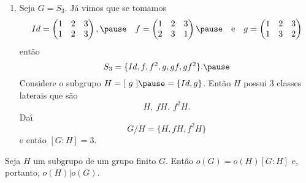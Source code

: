 \documentclass{beamer}
\begin{document}
    \begin{frame}
        \begin{exemplos}
            \begin{enumerate}[label=({\arabic*})]
                \conti

                \item Seja $G = S_3$. \pause J\'a vimos que se tomamos
                \[
                    Id = \begin{pmatrix}
                        1 & 2 & 3\\
                        1 & 2 & 3
                    \end{pmatrix}, \pause\quad
                    f = \begin{pmatrix}
                        1 & 2 & 3\\
                        2 & 3 & 1
                    \end{pmatrix} \pause \quad \mbox{e}\quad
                    g = \begin{pmatrix}
                        1 & 2 & 3\\
                        1 & 3 & 2
                    \end{pmatrix}
                \]
                ent\~ao
                \[
                    S_3 = \{Id, f, f^2, g, gf, gf^2\}. \pause
                \]
                Considere o subgrupo $H = [\ g\ ] \pause = \{Id, g\}$. Ent\~ao $H$ possui 3 classes laterais que s\~ao
                \[
                    H,\ fH,\ f^2H. 
                \]
                Da{\'\i}
                \[
                    G/H = \{H, fH, f^2H\}
                \]
                e ent\~ao $[G : H] = 3$.
            \end{enumerate}
        \end{exemplos}
    \end{frame}

    \begin{frame}
        \begin{teorema}
            Seja $H$ um subgrupo de um grupo finito $G$. Ent\~ao $o(G) = o(H)[G:H]$ e, portanto, $o(H) | o(G)$.
        \end{teorema}
    \end{frame}
\end{document}
